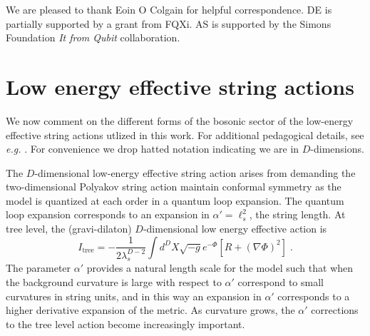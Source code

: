 \documentclass[amsmath,amssymb,11pt]{article}
\newcommand{\beq}{\begin{equation}}
\newcommand{\eeq}{\end{equation}}
\begin{document}
We are pleased to thank Eoin O Colgain for helpful correspondence. DE is partially supported by a grant from FQXi. AS is supported by the Simons Foundation \emph{It from Qubit} collaboration.



\appendix


\section{Low energy effective string actions}\label{sec:apploweeffact}

We now comment on the different forms of the bosonic sector of the low-energy effective string actions utlized in this work. For additional pedagogical details, see \emph{e.g.} \cite{Gasperini07-1}. For convenience we drop hatted notation indicating we are in $D$-dimensions. 

The $D$-dimensional low-energy effective string action arises from demanding the two-dimensional Polyakov string action maintain conformal symmetry as the model is quantized at each order in a quantum loop expansion. The quantum loop expansion corresponds to an expansion in $\alpha'=\ell_{s}^{2}$, the string length. At tree level, the (gravi-dilaton) $D$-dimensional low energy effective action is 
\beq I_{\text{tree}}=-\frac{1}{2\lambda^{D-2}_{s}}\int d^{D}X\sqrt{-g}e^{-\Phi}[R+(\nabla\Phi)^{2}]\;.\eeq
The parameter $\alpha'$ provides a natural length scale for the model such that when the background curvature is large with respect to $\alpha'$ correspond to small curvatures in string units, and in this way an expansion in $\alpha'$ corresponds to a higher derivative expansion of the metric. As curvature grows, the $\alpha'$ corrections to the tree level action become increasingly important.
\end{document}
